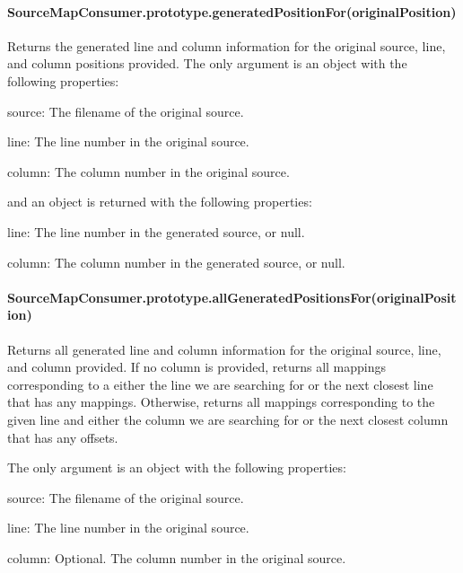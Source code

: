 \paragraph*{Source\+Map\+Consumer.\+prototype.\+generated\+Position\+For(original\+Position)}

Returns the generated line and column information for the original source, line, and column positions provided. The only argument is an object with the following properties\+:


\begin{DoxyItemize}
\item {\ttfamily source}\+: The filename of the original source.
\item {\ttfamily line}\+: The line number in the original source.
\item {\ttfamily column}\+: The column number in the original source.
\end{DoxyItemize}

and an object is returned with the following properties\+:


\begin{DoxyItemize}
\item {\ttfamily line}\+: The line number in the generated source, or null.
\item {\ttfamily column}\+: The column number in the generated source, or null.
\end{DoxyItemize}

\paragraph*{Source\+Map\+Consumer.\+prototype.\+all\+Generated\+Positions\+For(original\+Position)}

Returns all generated line and column information for the original source, line, and column provided. If no column is provided, returns all mappings corresponding to a either the line we are searching for or the next closest line that has any mappings. Otherwise, returns all mappings corresponding to the given line and either the column we are searching for or the next closest column that has any offsets.

The only argument is an object with the following properties\+:


\begin{DoxyItemize}
\item {\ttfamily source}\+: The filename of the original source.
\item {\ttfamily line}\+: The line number in the original source.
\item {\ttfamily column}\+: Optional. The column number in the original source.
\end{DoxyItemize}

